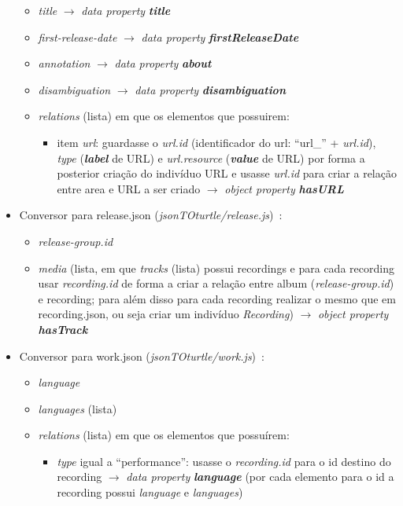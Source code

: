\documentclass{article}
\begin{document}
\begin{itemize}
\begin{itemize}
            \item \textit{title} $\to$ \textit{data property} \textit{\textbf{title}}
            \item \textit{first-release-date} $\to$ \textit{data property} \textit{\textbf{firstReleaseDate}}
            \item \textit{annotation} $\to$ \textit{data property} \textit{\textbf{about}}
            \item \textit{disambiguation} $\to$ \textit{data property} \textit{\textbf{disambiguation}}
            \item \textit{relations} (lista) em que os elementos que possuirem:
                \begin{itemize}
                    \item item \textit{url}: guardasse o \textit{url.id} (identificador do url: ``url\_'' + \textit{url.id}), \textit{type} (\textit{\textbf{label}} de URL) e \textit{url.resource} (\textit{\textbf{value}} de URL) por forma a posterior criação do indivíduo URL e usasse \textit{url.id} para criar a relação entre area e URL a ser criado $\to$ \textit{object property} \textit{\textbf{hasURL}}
                \end{itemize}
        \end{itemize}
    \item Conversor para release.json (\textit{jsonTOturtle/release.js})~\cite{mbRe}:
        \begin{itemize}
            \item \textit{release-group.id}
            \item \textit{media} (lista, em que \textit{tracks} (lista) possui recordings e para cada recording usar \textit{recording.id} de forma a criar a relação entre album (\textit{release-group.id}) e recording; para além disso para cada recording realizar o mesmo que em recording.json, ou seja criar um indivíduo \textit{Recording}) $\to$ \textit{object property} \textit{\textbf{hasTrack}}
        \end{itemize}
    \item Conversor para work.json (\textit{jsonTOturtle/work.js})~\cite{mbWo}:
        \begin{itemize}
            \item \textit{language}
            \item \textit{languages} (lista)
            \item \textit{relations} (lista) em que os elementos que possuírem:
                \begin{itemize}
                    \item \textit{type} igual a ``performance'': usasse o \textit{recording.id} para o id destino do recording $\to$ \textit{data property} \textit{\textbf{language}} (por cada elemento para o id a recording possui \textit{language} e \textit{languages})
                \end{itemize}
        \end{itemize}
\end{itemize}
\end{document}
